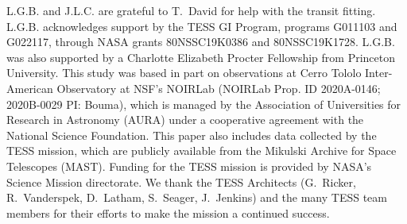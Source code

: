 \documentclass[12pt,modern,tighten]{aastex63}
\begin{document}
L.G.B{.} and J.L.C{.} are grateful to T{.}~David for help with the
transit fitting.
%
L.G.B{.} acknowledges support by the TESS GI Program, programs
G011103 and G022117, through NASA grants 80NSSC19K0386 and
80NSSC19K1728.
%
L.G.B{.} was also supported by a Charlotte Elizabeth Procter
Fellowship from Princeton University.
%
This study was based in part on observations at Cerro Tololo
Inter-American Observatory at NSF's NOIRLab (NOIRLab Prop{.} ID
2020A-0146; 2020B-0029 PI: Bouma), which is managed by the
Association of Universities for Research in Astronomy (AURA) under a
cooperative agreement with the National Science Foundation.
%
%
This paper also includes data collected by the TESS mission, which are
publicly available from the Mikulski Archive for Space Telescopes
(MAST).
%
Funding for the TESS mission is provided by NASA's Science Mission
directorate.
%
We thank the TESS Architects (G.~Ricker, R.~Vanderspek, D.~Latham,
S.~Seager, J.~Jenkins) and the many TESS team members for their
efforts to make the mission a continued success.
%

%
%


%
\end{document}
